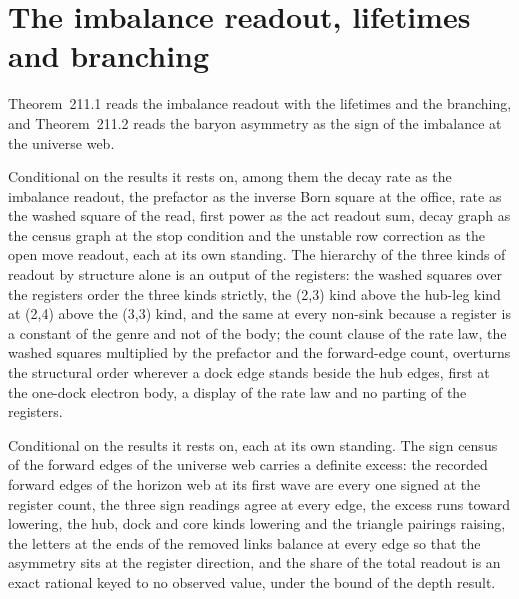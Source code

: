 \section{The imbalance readout, lifetimes and branching}\label{mod:IX-4-imbalance-readout-lifetimes-and-branching}
\label{narr:open:9-4}Theorem~211.1 reads the imbalance readout with the lifetimes and the branching, and Theorem~211.2 reads the baryon asymmetry as the sign of the imbalance at the universe web.
\begin{chconditional}\label{box:IX-4-imbalance-readout-lifetimes-and-branching:1}
Conditional on the results it rests on, among them the decay rate as the imbalance readout, the prefactor as the inverse Born square at the office, rate as the washed square of the read, first power as the act readout sum, decay graph as the census graph at the stop condition and the unstable row correction as the open move readout, each at its own standing. The hierarchy of the three kinds of readout by structure alone is an output of the registers: the washed squares over the registers order the three kinds strictly, the (2,3) kind above the hub-leg kind at (2,4) above the (3,3) kind, and the same at every non-sink because a register is a constant of the genre and not of the body; the count clause of the rate law, the washed squares multiplied by the prefactor and the forward-edge count, overturns the structural order wherever a dock edge stands beside the hub edges, first at the one-dock electron body, a display of the rate law and no parting of the registers.
\end{chconditional}
\begin{chconditional}\label{box:IX-4-imbalance-readout-lifetimes-and-branching:2}
Conditional on the results it rests on, each at its own standing. The sign census of the forward edges of the universe web carries a definite excess: the recorded forward edges of the horizon web at its first wave are every one signed at the register count, the three sign readings agree at every edge, the excess runs toward lowering, the hub, dock and core kinds lowering and the triangle pairings raising, the letters at the ends of the removed links balance at every edge so that the asymmetry sits at the register direction, and the share of the total readout is an exact rational keyed to no observed value, under the bound of the depth result.
\end{chconditional}
